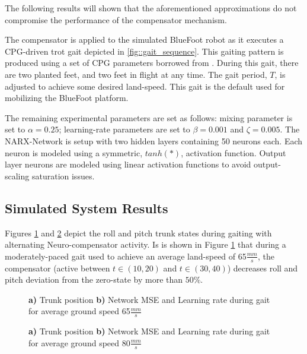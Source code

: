 The following results will shown that the aforementioned approximations do not compromise the performance
of the compensator mechanism.

The compensator is applied to the simulated BlueFoot robot as it executes a CPG-driven trot gait depicted in \ref{fig::gait_sequence}.
This gaiting pattern is produced using a set of CPG parameters borrowed from \MissingRef.
During this gait, there are two planted feet, and two feet in flight at any time. The gait period, $T$, is adjusted to achieve 
some desired land-speed. This gait is the default used for mobilizing the BlueFoot platform.

The remaining experimental parameters are set as follows: mixing parameter is set to $\alpha=0.25$; learning-rate parameters are set to
$\beta=0.001$ and $\zeta=0.005$. The NARX-Network is setup with two hidden layers containing 50 neurons each. Each neuron is modeled
using a symmetric, $tanh(*)$, activation function. Output layer neurons are modeled using linear activation functions to avoid 
output-scaling saturation issues.


\subsection{Simulated System Results}


Figures \ref{fig::65mms_result} and \ref{fig::80mms_result} depict the roll and pitch trunk states during gaiting with alternating
Neuro-compensator activity. Is is shown in Figure \ref{fig::65mms_result} that during a moderately-paced gait used to achieve an
average land-speed of 65$\frac{mm}{s}$, the compensator (active between $t\in(10,20)$ and $t\in(30,40)$) decreases roll and pitch 
deviation from the zero-state by more than $50\%$. 

\begin{figure}[t!]
	\begin{subfigure}{0.5\textwidth}
		\centering
		\caption{ }
	\end{subfigure}
	\begin{subfigure}{0.5\textwidth}
		\centering
		\caption{ }
	\end{subfigure}
	\caption{ \textbf{a)} Trunk position \SSep \textbf{b)} Network MSE and Learning rate during gait for average ground speed 65$\frac{mm}{s}$  }
	\label{fig::65mms_result}
\end{figure}
\begin{figure}[t!]
	\begin{subfigure}{0.5\textwidth}
		\centering
		\caption{ }
	\end{subfigure}
	\begin{subfigure}{0.5\textwidth}
		\centering
		\caption{ }
	\end{subfigure}
	\caption{ \textbf{a)} Trunk position \SSep \textbf{b)} Network MSE and Learning rate during gait for average ground speed 80$\frac{mm}{s}$  }
	\label{fig::80mms_result}
\end{figure}